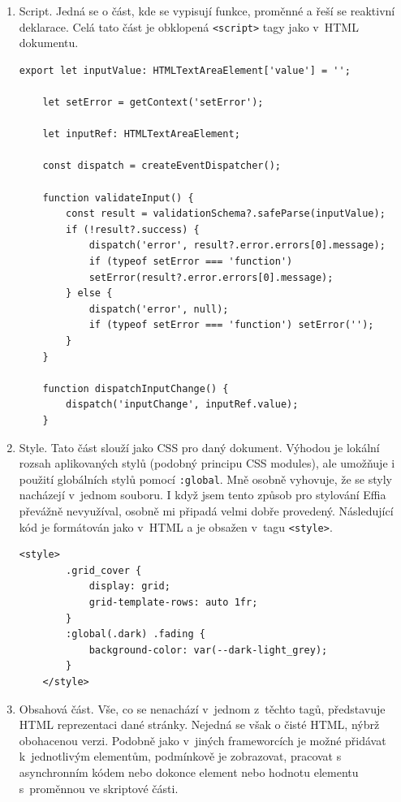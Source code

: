 \documentclass[12pt, a4paper,
openright
]{report}
\begin{document}
\begin{enumerate}
	\item Script. Jedná se o část, kde se vypisují funkce, proměnné a řeší se reaktivní deklarace. Celá tato část je obklopená \texttt{<script>} tagy jako v~HTML dokumentu.
	\begin{lstlisting}[style=ES6, caption=Ukázka Svelte kódu ve script tagu, label=svelte-script-sample]
	export let inputValue: HTMLTextAreaElement['value'] = '';
	
	let setError = getContext('setError');
	
	let inputRef: HTMLTextAreaElement;
	
	const dispatch = createEventDispatcher();
	
	function validateInput() {
		const result = validationSchema?.safeParse(inputValue);
		if (!result?.success) {
			dispatch('error', result?.error.errors[0].message);
			if (typeof setError === 'function')
			setError(result?.error.errors[0].message);
		} else {
			dispatch('error', null);
			if (typeof setError === 'function') setError('');
		}
	}
	
	function dispatchInputChange() {
		dispatch('inputChange', inputRef.value);
	}\end{lstlisting}
	\item Style. Tato část slouží jako CSS pro daný dokument. Výhodou je lokální rozsah aplikovaných stylů (podobný principu CSS modules), ale umožňuje i použití globálních stylů pomocí \texttt{:global}. Mně osobně vyhovuje, že se styly nacházejí v~jednom souboru. I když jsem tento způsob pro stylování Effia převážně nevyužíval, osobně mi připadá velmi dobře provedený. Následující kód je formátován jako v~HTML a je obsažen v~tagu \texttt{<style>}.
	
	\begin{lstlisting}[style=ES6, caption=Ukázka Svelte CSS kódu, label=svelte-CSS-sample]
	<style>
		.grid_cover {
			display: grid;
			grid-template-rows: auto 1fr;
		}
		:global(.dark) .fading {
			background-color: var(--dark-light_grey);
		}
	</style>\end{lstlisting}
	\item Obsahová část. Vše, co se nenachází v~jednom z~těchto tagů, představuje HTML reprezentaci dané stránky. Nejedná se však o čisté HTML, nýbrž obohacenou verzi. Podobně jako v~jiných frameworcích je možné přidávat  k~jednotlivým elementům, podmínkově je zobrazovat, pracovat s asynchronním kódem nebo dokonce  element nebo hodnotu elementu s~proměnnou ve skriptové části.
	

\end{enumerate}
\end{document}
